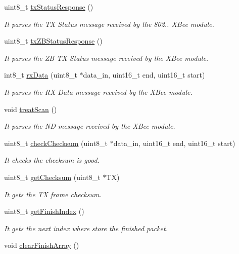 \begin{DoxyCompactItemize}
uint8\+\_\+t \hyperlink{class_wasp_x_bee_core_aeb522dccf2aa2a4f917a441e813c11a1}{tx\+Status\+Response} ()
\begin{DoxyCompactList}\small\item\em It parses the TX Status message received by the 802.. X\+Bee module. \end{DoxyCompactList}\item 
uint8\+\_\+t \hyperlink{class_wasp_x_bee_core_a233cf9332dea6f075edd3947f65bd373}{tx\+Z\+B\+Status\+Response} ()
\begin{DoxyCompactList}\small\item\em It parses the ZB TX Status message received by the X\+Bee module. \end{DoxyCompactList}\item 
int8\+\_\+t \hyperlink{class_wasp_x_bee_core_a85f0e8826d504eadea5f0cd1b5bd9e8a}{rx\+Data} (uint8\+\_\+t $\ast$data\+\_\+in, uint16\+\_\+t end, uint16\+\_\+t start)
\begin{DoxyCompactList}\small\item\em It parses the RX Data message received by the X\+Bee module. \end{DoxyCompactList}\item 
void \hyperlink{class_wasp_x_bee_core_a692aef52f76fef48dd21605deb6f9be6}{treat\+Scan} ()
\begin{DoxyCompactList}\small\item\em It parses the ND message received by the X\+Bee module. \end{DoxyCompactList}\item 
uint8\+\_\+t \hyperlink{class_wasp_x_bee_core_a705084510b2fa53cc22b44b400a1600d}{check\+Checksum} (uint8\+\_\+t $\ast$data\+\_\+in, uint16\+\_\+t end, uint16\+\_\+t start)
\begin{DoxyCompactList}\small\item\em It checks the checksum is good. \end{DoxyCompactList}\item 
uint8\+\_\+t \hyperlink{class_wasp_x_bee_core_af8b033c03d319cbdb45a24685b7e6553}{get\+Checksum} (uint8\+\_\+t $\ast$TX)
\begin{DoxyCompactList}\small\item\em It gets the TX frame checksum. \end{DoxyCompactList}\item 
uint8\+\_\+t \hyperlink{class_wasp_x_bee_core_a6fe87d248aa0a4cc9206ec7379d37a1e}{get\+Finish\+Index} ()
\begin{DoxyCompactList}\small\item\em It gets the next index where store the finished packet. \end{DoxyCompactList}\item 
void \hyperlink{class_wasp_x_bee_core_a2fe3689d4bf058cf875e2db259c6f812}{clear\+Finish\+Array} ()\hypertarget{class_wasp_x_bee_core_a2fe3689d4bf058cf875e2db259c6f812}{}\label{class_wasp_x_bee_core_a2fe3689d4bf058cf875e2db259c6f812}


\end{DoxyCompactItemize}

